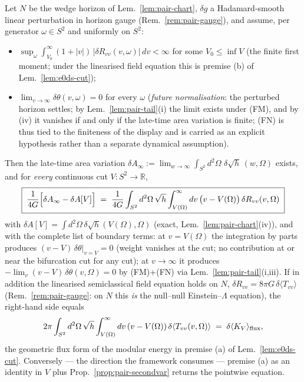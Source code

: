 \begin{theorem}
\label{thm:pair-main}
Let $N$ be the wedge horizon of Lem.~\ref{lem:pair-chart}, $\delta g$
a Hadamard-smooth linear perturbation in horizon gauge
(Rem.~\ref{rem:pair-gauge}), and assume, per generator $\omega\in
S^{2}$ and uniformly on $S^{2}$:
\begin{itemize}
\item[$\mathrm{(FM)}$] $\displaystyle\sup_{\omega}\int_{V_{0}}
^{\infty}(1+|v|)\,\bigl|\delta R_{vv}(v,\omega)\bigr|\,dv<\infty$ for
some $V_{0}\le\inf V$ (the finite first moment; under the linearised
field equation this is premise (b) of Lem.~\ref{lem:e0ds-cut});
\item[$\mathrm{(FN)}$] $\displaystyle\lim_{v\to\infty}\delta\theta(v,
\omega)=0$ for every $\omega$ (\emph{future normalisation}: the
perturbed horizon settles; by Lem.~\ref{lem:pair-tail}(i) the limit
exists under (FM), and by (iv) it vanishes if and only if the
late-time area variation is finite; (FN) is thus tied to the
finiteness of the display and is carried as an explicit hypothesis
rather than a separate dynamical assumption).
\end{itemize}
Then the late-time area variation
$\delta A_{\infty}:=\lim_{w\to\infty}\int_{S^{2}}d^{2}\Omega\,\,\delta
\sqrt h\,(w,\Omega)$ exists, and for \emph{every} continuous cut
$V:S^{2}\to\mathbb{R}$,
\[
\boxed{\;
\frac{1}{4G}\Bigl[\delta A_{\infty}-\delta A[V]\Bigr]
\;=\;
\frac{1}{4G}\int_{S^{2}}d^{2}\Omega\,\sqrt h
\int_{V(\Omega)}^{\infty}dv\,\bigl(v-V(\Omega)\bigr)\,
\delta R_{vv}(v,\Omega)
\;}
\]
with $\delta A[V]=\int d^{2}\Omega\,\delta\sqrt h(V(\Omega),\Omega)$
(exact, Lem.~\ref{lem:pair-chart}(iv)), and with the complete list of
boundary terms: at $v=V(\Omega)$ the integration by parts produces
$(v-V)\,\delta\theta|_{v=V}=0$ (weight vanishes at the cut; no
contribution at or near the bifurcation cut for any cut); at
$v\to\infty$ it produces $-\lim_{v}(v-V)\,\delta\theta(v,\Omega)=0$ by
(FM)+(FN) via Lem.~\ref{lem:pair-tail}(i,iii). If in addition the
linearised semiclassical field equation holds on $N$,
$\delta R_{vv}=8\pi G\,\delta\langle T_{vv}\rangle$
(Rem.~\ref{rem:pair-gauge}: on $N$ this \emph{is} the null--null
Einstein--$\Lambda$ equation), the right-hand side equals
\[
2\pi\int_{S^{2}}d^{2}\Omega\,\sqrt h\int_{V(\Omega)}^{\infty}dv\,
(v-V(\Omega))\,\delta\langle T_{vv}(v,\Omega)\rangle
\;=\;\delta\langle K_{V}\rangle_{\rm flux},
\]
the geometric flux form of the modular energy in premise (a) of
Lem.~\ref{lem:e0ds-cut}. Conversely --- the direction the framework
consumes --- premise (a) as an identity in $V$ plus
Prop.~\ref{prop:pair-secondvar} returns the pointwise equation.
\end{theorem}

